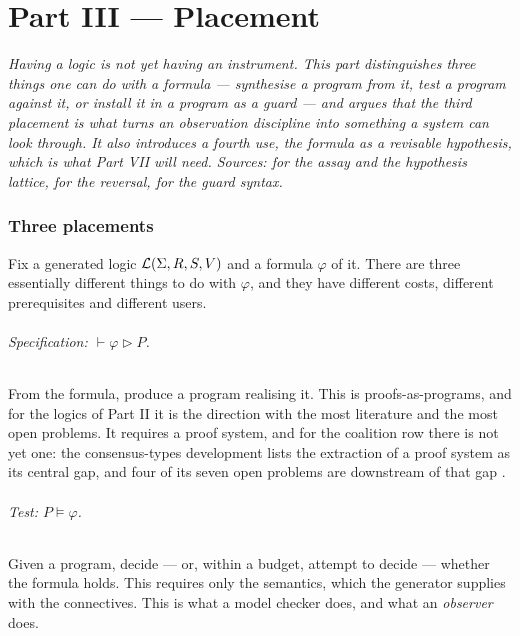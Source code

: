 \part*{Part III --- Placement}

\bigskip
\noindent
\emph{Having a logic is not yet having an instrument. This part distinguishes
three things one can do with a formula --- synthesise a program from it, test a
program against it, or install it in a program as a guard --- and argues that the
third placement is what turns an observation discipline into something a system
can look through. It also introduces a fourth use, the formula as a revisable
hypothesis, which is what Part VII will need. Sources: \cite{ScientistNote} for
the assay and the hypothesis lattice, \cite{QuorumNote} for the reversal,
\cite{GsltOmnibus,GradedWhere} for the guard syntax.}
\bigskip

\section{Three placements}
\label{sec:placements}

Fix a generated logic $\mathcal{L}(\Sigma,R,S,V)$ and a formula $\varphi$ of it.
There are three essentially different things to do with $\varphi$, and they have
different costs, different prerequisites and different users.

\paragraph{Specification: $\vdash \varphi \triangleright P$.} From the formula,
produce a program realising it. This is proofs-as-programs, and for the logics of
Part II it is the direction with the most literature and the most open problems.
It requires a proof system, and for the coalition row there is not yet one: the
consensus-types development lists the extraction of a proof system as its central
gap, and four of its seven open problems are downstream of that gap
\cite{ConsensusTypes}.

\paragraph{Test: $P \models \varphi$.} Given a program, decide --- or, within a
budget, attempt to decide --- whether the formula holds. This requires only the
semantics, which the generator supplies with the connectives. This is what a model
checker does, and what an \emph{observer} does.

